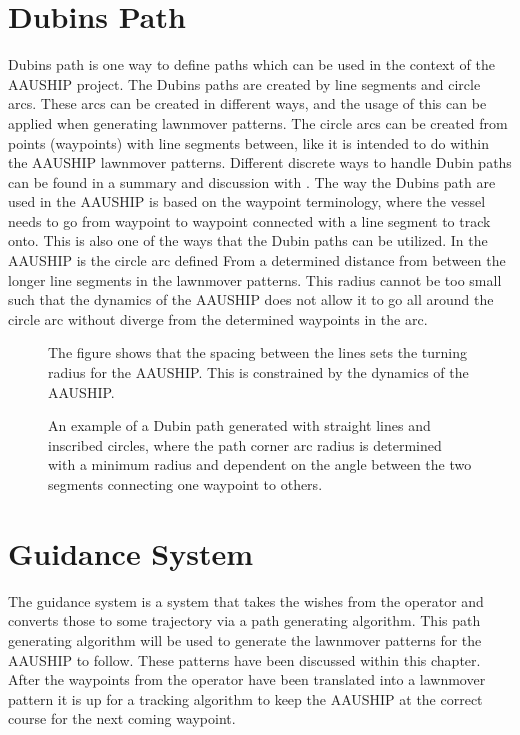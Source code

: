 \section{Dubins Path}
Dubins path is one way to define paths which can be used in the
context of the AAUSHIP project. The Dubins paths are created by line
segments and circle arcs. These arcs can be created in different ways,
and the usage of this can be applied when generating lawnmover
patterns. The circle arcs can be created from points (waypoints) with
line segments between, like it is intended to do within the AAUSHIP
lawnmover patterns. Different discrete ways to handle Dubin paths can
be found in a summary and discussion with \citep{dubin}. The way the
Dubins path are used in the AAUSHIP is based on the waypoint
terminology, where the vessel needs to go from waypoint to waypoint
connected with a line segment to track onto. This is also one of the
ways that the Dubin paths can be utilized. In the AAUSHIP is the
circle arc defined From a determined distance from between the longer
line segments in the lawnmover patterns. This radius cannot be too
small such that the dynamics of the AAUSHIP does not allow it to go
all around the circle arc without diverge from the determined
waypoints in the arc.
\begin{figure}[htbp]
	\centering
	
	\caption{The figure shows that the spacing between the lines sets the turning radius for the AAUSHIP. This is constrained by the dynamics of the AAUSHIP.}
	\label{fig:lawnmoverturn}
\end{figure}


\begin{figure}[htbp]
	\centering
	
	\caption{An example of a Dubin path generated with straight lines and
		inscribed circles, where the path corner arc radius is determined
	with a minimum radius and dependent on the angle between the two
segments connecting one waypoint to others.}
\label{fig:normal_dubin_path}
\end{figure}


\section{Guidance System}
The guidance system is a system that takes the wishes from the
operator and converts those to some trajectory via a path generating
algorithm. This path generating algorithm will be used to generate the lawnmover patterns for the AAUSHIP to follow. These patterns have been discussed within this chapter. After the waypoints from the operator have been translated into a lawnmover pattern it is up for a tracking algorithm to keep the AAUSHIP at the correct course for the next coming waypoint.

